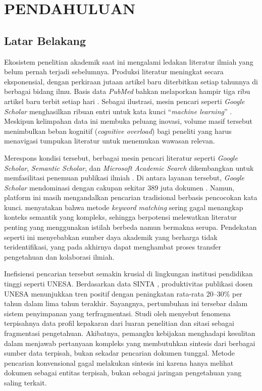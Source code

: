 \chapter{PENDAHULUAN}

\section{Latar Belakang}

Ekosistem penelitian akademik saat ini mengalami ledakan literatur ilmiah yang belum pernah terjadi sebelumnya. Produksi literatur meningkat secara eksponensial, dengan perkiraan jutaan artikel baru diterbitkan setiap tahunnya di berbagai bidang ilmu. Basis data \textit{PubMed} bahkan melaporkan hampir tiga ribu artikel baru terbit setiap hari \citep{lee2016best}. Sebagai ilustrasi, mesin pencari seperti \textit{Google Scholar} menghasilkan ribuan entri untuk kata kunci ``\textit{machine learning}'' \citep{Khalid2019OnTC}. Meskipun kelimpahan data ini membuka peluang inovasi, volume masif tersebut menimbulkan beban kognitif (\textit{cognitive overload}) bagi peneliti yang harus menavigasi tumpukan literatur untuk menemukan wawasan relevan.

Merespons kondisi tersebut, berbagai mesin pencari literatur seperti \textit{Google Scholar}, \textit{Semantic Scholar}, dan \textit{Microsoft Academic Search} dikembangkan untuk memfasilitasi penemuan publikasi ilmiah \citep{MartinMartin2021}. Di antara layanan tersebut, \textit{Google Scholar} mendominasi dengan cakupan sekitar 389 juta dokumen \citep{Gusenbauer2018Google}. Namun, platform ini masih mengandalkan pencarian tradisional berbasis pencocokan kata kunci. \citet{deerwester1990indexing} menyatakan bahwa metode \textit{keyword matching} sering gagal menangkap konteks semantik yang kompleks, sehingga berpotensi melewatkan literatur penting yang menggunakan istilah berbeda namun bermakna serupa. Pendekatan seperti ini menyebabkan sumber daya akademik yang berharga tidak teridentifikasi, yang pada akhirnya dapat menghambat proses transfer pengetahuan dan kolaborasi ilmiah.

Inefisiensi pencarian tersebut semakin krusial di lingkungan institusi pendidikan tinggi seperti UNESA. Berdasarkan data SINTA \citep{sinta_unesa2024}, produktivitas publikasi dosen UNESA menunjukkan tren positif dengan peningkatan rata-rata 20--30\% per tahun dalam lima tahun terakhir. Sayangnya, pertumbuhan ini tersebar dalam sistem penyimpanan yang terfragmentasi. Studi oleh \citet{9320965} menyebut fenomena terpisahnya data profil kepakaran dari luaran penelitian dan sitasi sebagai fragmentasi pengetahuan. Akibatnya, pemangku kebijakan menghadapi kesulitan dalam menjawab pertanyaan kompleks yang membutuhkan sintesis dari berbagai sumber data terpisah, bukan sekadar pencarian dokumen tunggal. Metode pencarian konvensional gagal melakukan sintesis ini karena hanya melihat dokumen sebagai entitas terpisah, bukan sebagai jaringan pengetahuan yang saling terkait.

